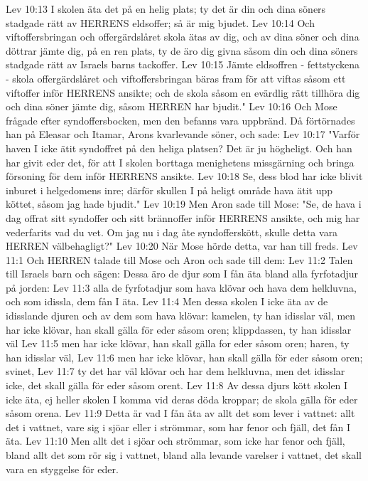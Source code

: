 Lev 10:13  I skolen äta det på en helig plats; ty det är din och dina söners stadgade rätt av HERRENS eldsoffer; så är mig bjudet.
Lev 10:14  Och viftoffersbringan och offergärdslåret skola ätas av dig, och av dina söner och dina döttrar jämte dig, på en ren plats, ty de äro dig givna såsom din och dina söners stadgade rätt av Israels barns tackoffer.
Lev 10:15  Jämte eldsoffren - fettstyckena - skola offergärdslåret och viftoffersbringan bäras fram för att viftas såsom ett viftoffer inför HERRENS ansikte; och de skola såsom en evärdlig rätt tillhöra dig och dina söner jämte dig, såsom HERREN har bjudit."
Lev 10:16  Och Mose frågade efter syndoffersbocken, men den befanns vara uppbränd. Då förtörnades han på Eleasar och Itamar, Arons kvarlevande söner, och sade:
Lev 10:17  "Varför haven I icke ätit syndoffret på den heliga platsen? Det är ju högheligt. Och han har givit eder det, för att I skolen borttaga menighetens missgärning och bringa försoning för dem inför HERRENS ansikte.
Lev 10:18  Se, dess blod har icke blivit inburet i helgedomens inre; därför skullen I på heligt område hava ätit upp köttet, såsom jag hade bjudit."
Lev 10:19  Men Aron sade till Mose: "Se, de hava i dag offrat sitt syndoffer och sitt brännoffer inför HERRENS ansikte, och mig har vederfarits vad du vet. Om jag nu i dag åte syndofferskött, skulle detta vara HERREN välbehagligt?"
Lev 10:20  När Mose hörde detta, var han till freds.
Lev 11:1  Och HERREN talade till Mose och Aron och sade till dem:
Lev 11:2  Talen till Israels barn och sägen: Dessa äro de djur som I fån äta bland alla fyrfotadjur på jorden:
Lev 11:3  alla de fyrfotadjur som hava klövar och hava dem helkluvna, och som idissla, dem fån I äta.
Lev 11:4  Men dessa skolen I icke äta av de idisslande djuren och av dem som hava klövar: kamelen, ty han idisslar väl, men har icke klövar, han skall gälla för eder såsom oren; klippdassen, ty han idisslar väl
Lev 11:5  men har icke klövar, han skall gälla for eder såsom oren; haren, ty han idisslar väl,
Lev 11:6  men har icke klövar, han skall gälla för eder såsom oren; svinet,
Lev 11:7  ty det har väl klövar och har dem helkluvna, men det idisslar icke, det skall gälla för eder såsom orent.
Lev 11:8  Av dessa djurs kött skolen I icke äta, ej heller skolen I komma vid deras döda kroppar; de skola gälla för eder såsom orena.
Lev 11:9  Detta är vad I fån äta av allt det som lever i vattnet: allt det i vattnet, vare sig i sjöar eller i strömmar, som har fenor och fjäll, det fån I äta.
Lev 11:10  Men allt det i sjöar och strömmar, som icke har fenor och fjäll, bland allt det som rör sig i vattnet, bland alla levande varelser i vattnet, det skall vara en styggelse för eder.
